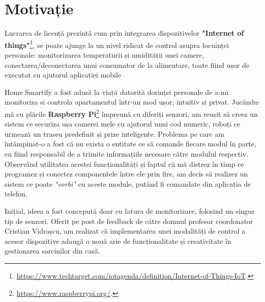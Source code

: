\chapter*{Motivație} 

Lucrarea de licență prezintă cum prin integrarea dispozitivelor \textbf{"Internet of things"}\footnote{\url{https://www.techtarget.com/iotagenda/definition/Internet-of-Things-IoT}.}, se poate ajunge la un nivel ridicat de control asupra locuinței personale: monitorizarea temperaturii și umidității unei camere, conectarea/deconectarea unui consumator de la alimentare, toate fiind ușor de executat cu ajutorul aplicației mobile

Home Smartify a fost adusă la viață datorită dorinței personale de a-mi monitoriza si controla apartamentul într-un mod ușor, intuitiv și privat. Jucându-mă cu plăcile \textbf{Raspberry Pi}\footnote{\url{https://www.raspberrypi.org/}.} împreună cu diferiți senzori, am reușit să creez un sistem ce securiza ușa camerei mele cu ajutorul unui cod numeric, roboți ce urmează un traseu predefinit și prize inteligente. Problema pe care am întâmpinat-o a fost că nu exista o entitate ce să comande fiecare modul în parte, eu fiind responsabil de a trimite informațiile necesare către modulul respectiv. Observând utilitatea acestei funcționalități și faptul că mă distrez în timp ce programez și conectez componentele între ele prin fire, am decis să realizez un sistem ce poate \emph{"vorbi"} cu aceste module, putând fi comandate din aplicația de telefon.

Inițial, ideea a fost concepută doar cu latura de monitorizare, folosind un singur tip de senzori. Oferit pe post de feedback de către domnul profesor coordonator Cristian Vidrașcu, am realizat că implementarea unei modalități de control a acesor dispozitive adaugă o nouă arie de funcționalitate și creativitate în gestionarea sarcinilor din casă.
